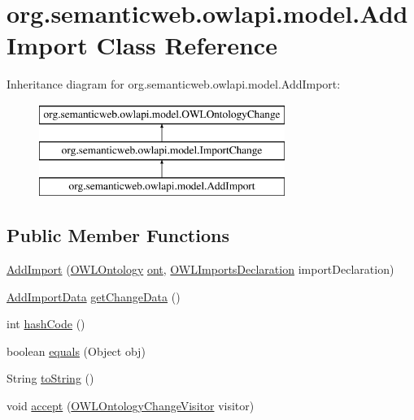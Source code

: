 \hypertarget{classorg_1_1semanticweb_1_1owlapi_1_1model_1_1_add_import}{\section{org.\-semanticweb.\-owlapi.\-model.\-Add\-Import Class Reference}
\label{classorg_1_1semanticweb_1_1owlapi_1_1model_1_1_add_import}
}
Inheritance diagram for org.\-semanticweb.\-owlapi.\-model.\-Add\-Import\-:\begin{figure}[H]
\begin{center}
\leavevmode
\includegraphics[height=3.000000cm]{classorg_1_1semanticweb_1_1owlapi_1_1model_1_1_add_import}
\end{center}
\end{figure}
\subsection*{Public Member Functions}
\begin{DoxyCompactItemize}
\item 
\hyperlink{classorg_1_1semanticweb_1_1owlapi_1_1model_1_1_add_import_a41a7e658092ab1372feb602a72c9d4f9}{Add\-Import} (\hyperlink{interfaceorg_1_1semanticweb_1_1owlapi_1_1model_1_1_o_w_l_ontology}{O\-W\-L\-Ontology} \hyperlink{classorg_1_1semanticweb_1_1owlapi_1_1model_1_1_o_w_l_ontology_change_a9b8b64f1cab33aae500db20e19186211}{ont}, \hyperlink{interfaceorg_1_1semanticweb_1_1owlapi_1_1model_1_1_o_w_l_imports_declaration}{O\-W\-L\-Imports\-Declaration} import\-Declaration)
\item 
\hyperlink{classorg_1_1semanticweb_1_1owlapi_1_1change_1_1_add_import_data}{Add\-Import\-Data} \hyperlink{classorg_1_1semanticweb_1_1owlapi_1_1model_1_1_add_import_ac7c51e053c30e52a408a7d795ee188be}{get\-Change\-Data} ()
\item 
int \hyperlink{classorg_1_1semanticweb_1_1owlapi_1_1model_1_1_add_import_a3d52db2bf98cbc89d10c597b970a4c64}{hash\-Code} ()
\item 
boolean \hyperlink{classorg_1_1semanticweb_1_1owlapi_1_1model_1_1_add_import_a4aed47558d1507594595fab17f33cb8e}{equals} (Object obj)
\item 
String \hyperlink{classorg_1_1semanticweb_1_1owlapi_1_1model_1_1_add_import_a35c74cb5079814f7c506bd6fc866fbb1}{to\-String} ()
\item 
void \hyperlink{classorg_1_1semanticweb_1_1owlapi_1_1model_1_1_add_import_adb42add095f8a961e33de6462ff5a7be}{accept} (\hyperlink{interfaceorg_1_1semanticweb_1_1owlapi_1_1model_1_1_o_w_l_ontology_change_visitor}{O\-W\-L\-Ontology\-Change\-Visitor} visitor)
\end{DoxyCompactItemize}


